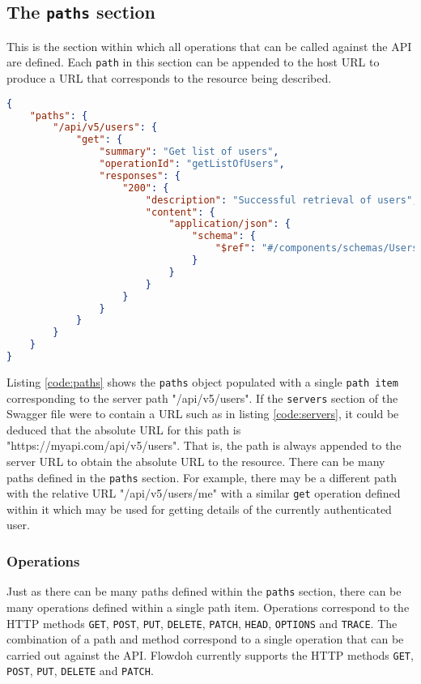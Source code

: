 \subsection{The \texttt{paths} section}
This is the section within which all operations that can be called against the API are defined. Each \texttt{path} in this section can be appended to the host URL to produce a URL that corresponds to the resource being described.
\begin{lstlisting}[caption={The \texttt{paths} object},label={code:paths},language=json]
{
    "paths": {
        "/api/v5/users": {
            "get": {
                "summary": "Get list of users",
                "operationId": "getListOfUsers",
                "responses": {
                    "200": {
                        "description": "Successful retrieval of users",
                        "content": {
                            "application/json": {
                                "schema": {
                                    "$ref": "#/components/schemas/UsersList"
                                }
                            }
                        }
                    }
                }
            }
        }
    }
}
\end{lstlisting}
Listing \ref{code:paths} shows the \texttt{paths} object populated with a single \texttt{path item} corresponding to the server path "/api/v5/users". If the \texttt{servers} section of the Swagger file were to contain a URL such as in listing \ref{code:servers}, it could be deduced that the absolute URL for this path is "https://myapi.com/api/v5/users". That is, the path is always appended to the server URL to obtain the absolute URL to the resource. There can be many paths defined in the \texttt{paths} section. For example, there may be a different path with the relative URL "/api/v5/users/me" with a similar \texttt{get} operation defined within it which may be used for getting details of the currently authenticated user.
\subsubsection{Operations}
\label{subsubsec:operations}
Just as there can be many paths defined within the \texttt{paths} section, there can be many operations defined within a single path item. Operations correspond to the HTTP methods \texttt{GET}, \texttt{POST}, \texttt{PUT}, \texttt{DELETE}, \texttt{PATCH}, \texttt{HEAD}, \texttt{OPTIONS} and \texttt{TRACE}. The combination of a path and method correspond to a single operation that can be carried out against the API. Flowdoh currently supports the HTTP methods \texttt{GET}, \texttt{POST}, \texttt{PUT}, \texttt{DELETE} and \texttt{PATCH}.

